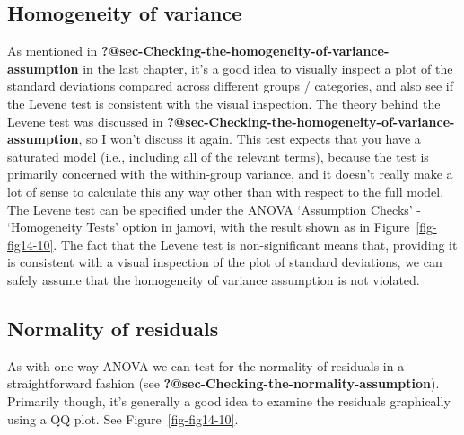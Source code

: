 \documentclass[
  a4paper,
]{book}
\begin{document}
\hypertarget{homogeneity-of-variance}{%
\subsection{Homogeneity of variance}\label{homogeneity-of-variance}}

As mentioned in
\textbf{?@sec-Checking-the-homogeneity-of-variance-assumption} in the
last chapter, it's a good idea to visually inspect a plot of the
standard deviations compared across different groups / categories, and
also see if the Levene test is consistent with the visual inspection.
The theory behind the Levene test was discussed in
\textbf{?@sec-Checking-the-homogeneity-of-variance-assumption}, so I
won't discuss it again. This test expects that you have a saturated
model (i.e., including all of the relevant terms), because the test is
primarily concerned with the within-group variance, and it doesn't
really make a lot of sense to calculate this any way other than with
respect to the full model. The Levene test can be specified under the
ANOVA `Assumption Checks' - `Homogeneity Tests' option in jamovi, with
the result shown as in Figure~\ref{fig-fig14-10}. The fact that the
Levene test is non-significant means that, providing it is consistent
with a visual inspection of the plot of standard deviations, we can
safely assume that the homogeneity of variance assumption is not
violated.

\hypertarget{normality-of-residuals}{%
\subsection{Normality of residuals}\label{normality-of-residuals}}

As with one-way ANOVA we can test for the normality of residuals in a
straightforward fashion (see
\textbf{?@sec-Checking-the-normality-assumption}). Primarily though,
it's generally a good idea to examine the residuals graphically using a
QQ plot. See Figure~\ref{fig-fig14-10}.
\end{document}
